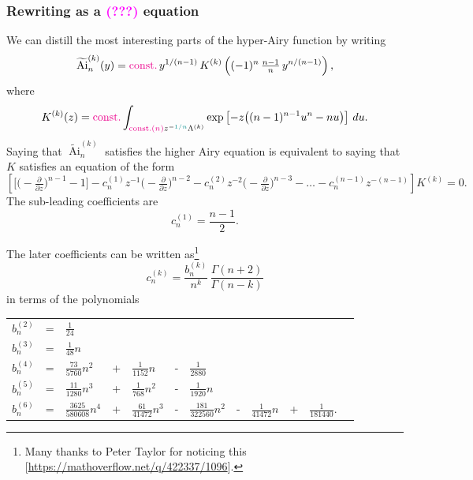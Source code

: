 \documentclass{article}
\theoremstyle{definition}
\DeclareMathOperator{\Ai}{Ai}
\begin{document}
\subsubsection{Rewriting as a \textcolor{magenta}{(???)} equation}
We can distill the most interesting parts of the hyper-Airy function by writing
\[ \widetilde{\Ai}^{(k)}_n(y) = \textcolor{magenta}{\text{const.}}\,y^{1/(n-1)}\,K^{(k)}\left((-1)^n\,\tfrac{n-1}{n}\,y^{n/(n-1)}\right), \]
where
\begin{equation}\label{int_higher-Ariy}
K^{(k)}(z) = \textcolor{magenta}{\text{const.}} \int_{\textcolor{magenta}{\text{const.}(n)} z^{-\textcolor{DarkCyan}{1/n}}\Lambda^{(k)}} \exp\left[-z\big((n-1)^{n-1} u^n - nu\big)\right]\,du.
\end{equation}
Saying that $\widetilde{\Ai}^{(k)}_n$ satisfies the higher Airy equation is equivalent to saying that $K$ satisfies an equation of the form
\begin{equation}\label{eqn:higher-Airy}
\left[ \big[ \big({-}\tfrac{\partial}{\partial z}\big)^{n-1} - 1 \big] - c_n^{(1)} z^{-1} \big({-}\tfrac{\partial}{\partial z}\big)^{n-2} - c_n^{(2)} z^{-2} \big({-}\tfrac{\partial}{\partial z}\big)^{n-3} - \ldots - c_n^{(n-1)} z^{-(n-1)} \right] K^{(k)} = 0.
\end{equation}
The sub-leading coefficients are 
\[ c_n^{(1)} = \frac{n-1}{2}. \]

The later coefficients can be written as\footnote{Many thanks to Peter Taylor for noticing this [\url{https://mathoverflow.net/q/422337/1096}].}
\[ c_n^{(k)} = \frac{b_n^{(k)}}{n^k}\,\frac{\Gamma(n+2)}{\Gamma(n-k)} \]
in terms of the polynomials

\begin{tabular}{llllllllllll}
$b_n^{(2)}$ & = & $\frac{1}{24}$ \\
$b_n^{(3)}$ & = & $\frac{1}{48} n$ \\
$b_n^{(4)}$ & = & $\frac{73}{5760} n^2$ & + & $\frac{1}{1152} n$ & - & $\frac{1}{2880}$ \\
$b_n^{(5)}$ & = & $\frac{11}{1280} n^{3}$ & + & $\frac{1}{768} n^{2}$ & - & $\frac{1}{1920} n$ \\
$b_n^{(6)}$ & = & $\frac{3625}{580608} n^{4}$ & + & $\frac{61}{41472} n^{3}$ & - & $\frac{181}{322560} n^{2}$ & - & $\frac{1}{41472} n$ & + & $\frac{1}{181440}$. 
\end{tabular}

\vspace{5mm}
\end{document}

